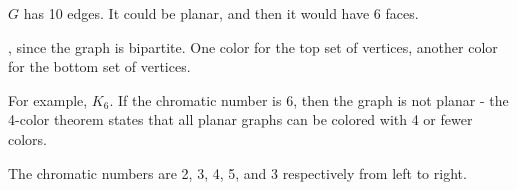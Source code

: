 \documentclass[11pt]{exam}
\newcommand{\vtx}[2]{node[fill,circle,inner sep=0pt, minimum size=7pt,label=#1:#2]{}}
\renewcommand{\v}{\vtx{above}{}}
\begin{document}
\begin{questions}
\question $G$ has 10 edges.  It could be planar, and then it would have 6 faces. %

, since the graph is bipartite.  One color for the top set of vertices, another color for the bottom set of vertices.  %

\question For example, $K_6$.  If the chromatic number is 6, then the graph is not planar - the 4-color theorem states that all planar graphs can be colored with 4 or fewer colors. %

\question The chromatic numbers are 2, 3, 4, 5, and 3 respectively from left to right. %
% 


\end{questions}
\end{document}
